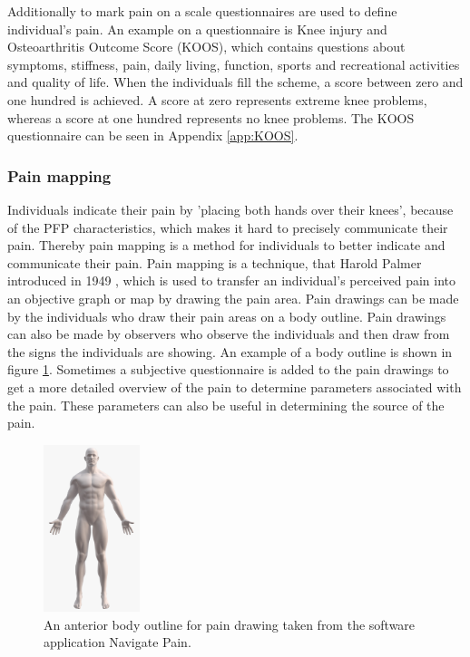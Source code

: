 \noindent
Additionally to mark pain on a scale questionnaires are used to define individual's pain. An example on a questionnaire is Knee injury and Osteoarthritis Outcome Score (KOOS), which contains questions about symptoms, stiffness, pain, daily living, function, sports and recreational activities and quality of life. When the individuals fill the scheme, a score between zero and one hundred is achieved. A score at zero represents extreme knee problems, whereas a score at one hundred represents no knee problems.\citep{Roos2003} The KOOS questionnaire can be seen in Appendix \ref{app:KOOS}. 
\noindent 


\subsubsection{Pain mapping}
Individuals indicate their pain by 'placing both hands over their knees', because of the PFP characteristics, which makes it hard to precisely communicate their pain. Thereby pain mapping is a method for individuals to better indicate and communicate their pain. 
\noindent
Pain mapping is a technique, that Harold Palmer introduced in 1949 \citep{Grunnesjo2006}, which is used to transfer an individual's perceived pain into an objective graph or map by drawing the pain area. Pain drawings can be made by the individuals who draw their pain areas on a body outline. Pain drawings can also be made by observers who observe the individuals and then draw from the signs the individuals are showing. An example of a body outline is shown in figure \ref{fig:painmap}. Sometimes a subjective questionnaire is added to the pain drawings to get a more detailed overview of the pain to determine parameters associated with the pain. These parameters can also be useful in determining the source of the pain.\citep{Schott2010}

\begin{figure} [H]
\centering
\includegraphics[width=0.25\textwidth]{figures/painmap}
\caption{An anterior body outline for pain drawing taken from the software application Navigate Pain.}
\label{fig:painmap}
\end{figure}

